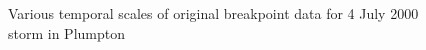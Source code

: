 \begin{figure}[htbp]
    \qquad
  \caption{Various temporal scales of original breakpoint data for 4 July 2000
storm in Plumpton}
  \label{fig:dr_storm}
\end{figure}

